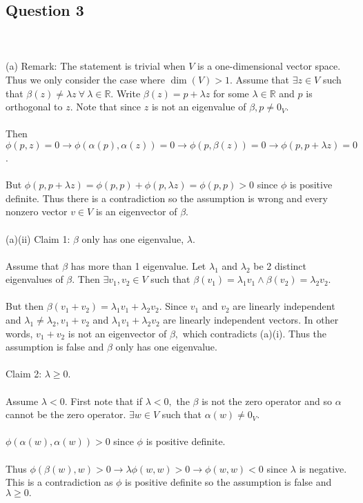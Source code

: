 \documentclass{article}
\begin{document}
\subsection*{Question 3}\\\\
(a) Remark: The statement is trivial when $V$ is a one-dimensional vector space. Thus we only consider the case where $\dim(V) > 1$. Assume that $\exists z \in V$ such that $\beta(z) \neq \lambda z \ \forall \ \lambda \in \mathbb{R}$. Write $\beta(z) = p + \lambda z$ for some $\lambda \in \mathbb{R}$ and $p$ is orthogonal to $z$. Note that since $z$ is not an eigenvalue of $\beta,p\neq 0_V.$\\\\
Then $\phi(p,z) = 0 \to \phi(\alpha(p),\alpha(z)) = 0 \to \phi(p,\beta(z)) = 0 \to \phi(p,p + \lambda z) = 0$.\\\\ But $\phi(p,p+\lambda z) = \phi(p,p) + \phi(p,\lambda z) = \phi(p,p) > 0$ since $\phi$ is positive definite. Thus there is a contradiction so the assumption is wrong and every nonzero vector $v\in V$ is an eigenvector of $\beta$.\\\\
(a)(ii) Claim 1: $\beta$ only has one eigenvalue, $\lambda$.\\\\
Assume that $\beta$ has more than 1 eigenvalue. Let $\lambda_1$ and $\lambda_2$ be 2 distinct eigenvalues of $\beta$. Then $\exists v_1,v_2 \in V$ such that $\beta(v_1) = \lambda_1 v_1 \land \beta(v_2) = \lambda_2 v_2$.\\\\ But then $\beta(v_1 + v_2) = \lambda_1 v_1 + \lambda_2 v_2$. Since $v_1$ and $v_2$ are linearly independent and $\lambda_1 \neq \lambda_2, v_1 + v_2$ and $\lambda_1 v_1 + \lambda_2 v_2$ are linearly independent vectors. In other words, $v_1 + v_2$ is not an eigenvector of $\beta,$ which contradicts (a)(i). Thus the assumption is false and $\beta$ only has one eigenvalue. \\\\
Claim 2: $\lambda \geq 0.$\\\\
Assume $\lambda < 0.$ First note that if $\lambda < 0,$ the $\beta$ is not the zero operator and so $\alpha$ cannot be the zero operator. $\exists w\in V$ such that $\alpha(w) \neq 0_V.$\\\\
$\phi(\alpha(w),\alpha(w)) > 0$ since $\phi$ is positive definite.\\\\ Thus $\phi(\beta(w),w) > 0 \to \lambda \phi(w,w) > 0 \to \phi(w,w) < 0$ since $\lambda$ is negative. This is a contradiction as $\phi$ is positive definite so the assumption is false and $\lambda \geq 0.$\\\\
\end{document}
